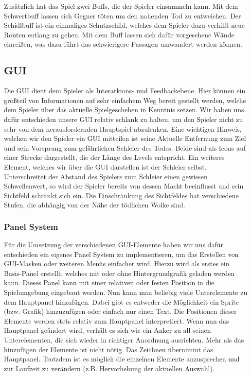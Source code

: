\documentclass[12pt]{article}
\begin{document}
Zusätzlich hat das Spiel zwei Buffs, die der Spieler einsammeln kann. Mit dem Schwertbuff lassen sich Gegner töten um den nahenden Tod zu entweichen.
Der Schidlbuff ist ein einmaliges Schutzschild, welches dem Spieler dazu verhilft neue Routen entlang zu gehen. Mit dem Buff lassen sich dafür vorgesehene
Wände einreißen, was dazu führt das schwierigere Passagen umwandert werden können.

\vspace{2cm}
\subsection{GUI}
Die GUI dient dem Spieler als Interatkions- und Feedbackebene. Hier können ein großteil von Informationen auf sehr einfachem Weg bereit gestellt werden, welche dem Spieler über das aktuelle Spielgeschehen in Kenntnis setzen.
Wir haben uns dafür entschieden unsere GUI relativ schlank zu halten, um den Spieler nicht zu sehr von dem herausfordernden Hauptspiel abzulenken.
Eine wichtigen Hinweis, welchen wir den Spieler via GUI mitteilen ist seine Aktuelle Entfernung zum Ziel und sein Vorsprung zum gefährlichen Schleier des Todes. Beide sind als Icons auf einer Strecke dargestellt, die der Länge des Levels entspricht. \newline
Ein weiteres Element, welches wir über die GUI darstellen ist der Schleier selbst. Unterschreitet der Abstand des Spielers zum Schleier einen gewissen Schwellenwert, so wird der Spieler bereits von dessen Macht beeinflusst und sein Sichtfeld schränkt sich ein. Die Einschränkung des Sichtfeldes hat verschiedene Stufen, die abhängig von der Nähe der tödlichen Wolke sind.

\vspace{1cm}
\subsubsection{Panel System}
Für die Umsetzung der verschiedenen GUI-Elemente haben wir uns dafür entschieden ein eigenes Panel System zu implementieren, um das Erstellen von GUI-Masken oder weiteren Menüs einfacher wird.
Hierzu wird als erstes ein Basis-Panel erstellt, welches mit oder ohne Hintergrundgrafik geladen werden kann. Dieses Panel kann mit einer relativen oder festen Position in die Spielumgebung eingebaut werden.
Nun kann man beliebig viele Unterelemente zu dem Hauptpanel hinzufügen.
Dabei gibt es entweder die Möglichkeit ein Sprite (bzw. Grafik) hinzuzufügen oder einfach nur einen Text. Die Positionen dieser Elemente werden stets relativ zum Hauptpanel interpretiert. Wenn nun das Hauptpanel geändert wird, verhält es sich wie ein Anker zu all seinen Unterelementen, die sich wieder in richtiger Anordnung ausrichten.
Mehr als das hinzufügen der Elemente ist nicht nötig. Das Zeichnen übernimmt das Hauptpanel. Trotzdem ist es möglich die einzelnen Elemente anzusprechen und zur Laufzeit zu verändern (z.B. Hervorhebung der aktuellen Auswahl).
\end{document}
